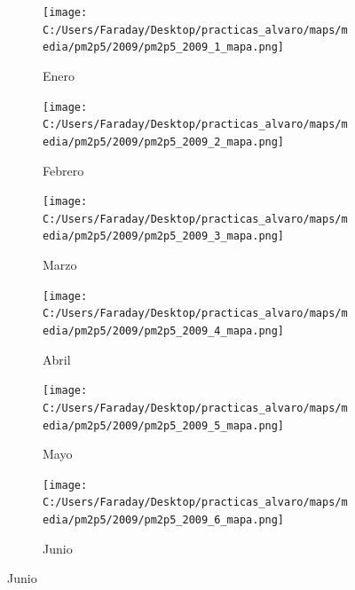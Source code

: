 \documentclass[12pt]{article}
\begin{document}
\begin{figure}[H]
\centering
\begin{subfigure}[H]{0.15\textwidth}
\texttt{[image: C:/Users/Faraday/Desktop/practicas\_alvaro/maps/media/pm2p5/2009/pm2p5\_2009\_1\_mapa.png]}
\captionsetup{labelformat=empty}
\caption{Enero}
\label{fig:map-pm2p5-2009-1}
\end{subfigure}
%
\begin{subfigure}[H]{0.15\textwidth}
\texttt{[image: C:/Users/Faraday/Desktop/practicas\_alvaro/maps/media/pm2p5/2009/pm2p5\_2009\_2\_mapa.png]}
\captionsetup{labelformat=empty}
\caption{Febrero}
\label{fig:map-pm2p5-2009-2}
\end{subfigure}
%
\begin{subfigure}[H]{0.15\textwidth}
\texttt{[image: C:/Users/Faraday/Desktop/practicas\_alvaro/maps/media/pm2p5/2009/pm2p5\_2009\_3\_mapa.png]}
\captionsetup{labelformat=empty}
\caption{Marzo}
\label{fig:map-pm2p5-2009-3}
\end{subfigure}
%
\begin{subfigure}[H]{0.15\textwidth}
\texttt{[image: C:/Users/Faraday/Desktop/practicas\_alvaro/maps/media/pm2p5/2009/pm2p5\_2009\_4\_mapa.png]}
\captionsetup{labelformat=empty}
\caption{Abril}
\label{fig:map-pm2p5-2009-4}
\end{subfigure}
%
\begin{subfigure}[H]{0.15\textwidth}
\texttt{[image: C:/Users/Faraday/Desktop/practicas\_alvaro/maps/media/pm2p5/2009/pm2p5\_2009\_5\_mapa.png]}
\captionsetup{labelformat=empty}
\caption{Mayo}
\label{fig:map-pm2p5-2009-5}
\end{subfigure}
%
\begin{subfigure}[H]{0.15\textwidth}
\texttt{[image: C:/Users/Faraday/Desktop/practicas\_alvaro/maps/media/pm2p5/2009/pm2p5\_2009\_6\_mapa.png]}
\captionsetup{labelformat=empty}
\caption{Junio}
\label{fig:map-pm2p5-2009-6}
\end{subfigure}


\end{figure}
\end{document}
